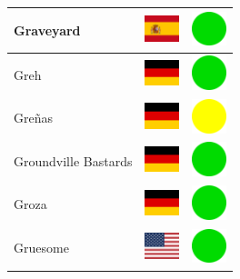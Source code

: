 \documentclass[12pt, a4paper, twoside]{report}
\begin{document}
\begin{center}
\begin{longtable}{|p{5cm}|p{2cm}|p{2cm}|}
 Graveyard                                                  & \includegraphics[width=1cm]{../4x3/es} &   \includegraphics[width=1cm]{../likes/y} \\ \hline
 Greh                                                       & \includegraphics[width=1cm]{../4x3/de} &   \includegraphics[width=1cm]{../likes/y} \\ \hline
 Greñas                                                     & \includegraphics[width=1cm]{../4x3/de} &   \includegraphics[width=1cm]{../likes/m} \\ \hline
 Groundville Bastards                                       & \includegraphics[width=1cm]{../4x3/de} &   \includegraphics[width=1cm]{../likes/y} \\ \hline
 Groza                                                      & \includegraphics[width=1cm]{../4x3/de} &   \includegraphics[width=1cm]{../likes/y} \\ \hline
 Gruesome                                                   & \includegraphics[width=1cm]{../4x3/us} &   \includegraphics[width=1cm]{../likes/y} \\ \hline

\end{longtable}
\end{center}
\end{document}
